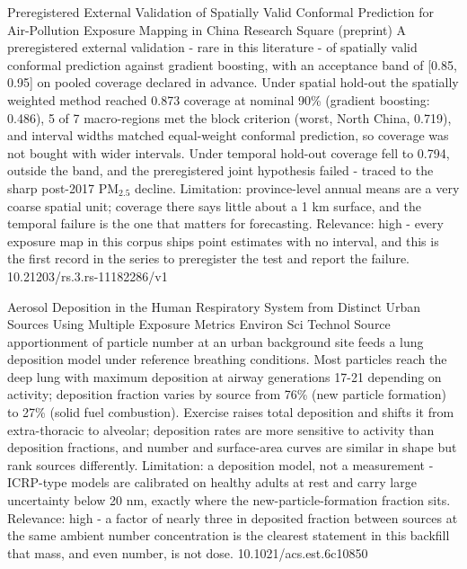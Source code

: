 \documentclass[10pt]{article}
\begin{document}
{Preregistered External Validation of Spatially Valid Conformal Prediction for Air-Pollution Exposure Mapping in China}
{Research Square (preprint)}
{A preregistered external validation - rare in this literature - of spatially valid conformal prediction against gradient boosting, with an acceptance band of [0.85, 0.95] on pooled coverage declared in advance. Under spatial hold-out the spatially weighted method reached 0.873 coverage at nominal 90\% (gradient boosting: 0.486), 5 of 7 macro-regions met the block criterion (worst, North China, 0.719), and interval widths matched equal-weight conformal prediction, so coverage was not bought with wider intervals. Under temporal hold-out coverage fell to 0.794, outside the band, and the preregistered joint hypothesis failed - traced to the sharp post-2017 PM$_{2.5}$ decline. Limitation: province-level annual means are a very coarse spatial unit; coverage there says little about a 1 km surface, and the temporal failure is the one that matters for forecasting. Relevance: high - every exposure map in this corpus ships point estimates with no interval, and this is the first record in the series to preregister the test and report the failure.}
{10.21203/rs.3.rs-11182286/v1}

{Aerosol Deposition in the Human Respiratory System from Distinct Urban Sources Using Multiple Exposure Metrics}
{Environ Sci Technol}
{Source apportionment of particle number at an urban background site feeds a lung deposition model under reference breathing conditions. Most particles reach the deep lung with maximum deposition at airway generations 17-21 depending on activity; deposition fraction varies by source from 76\% (new particle formation) to 27\% (solid fuel combustion). Exercise raises total deposition and shifts it from extra-thoracic to alveolar; deposition rates are more sensitive to activity than deposition fractions, and number and surface-area curves are similar in shape but rank sources differently. Limitation: a deposition model, not a measurement - ICRP-type models are calibrated on healthy adults at rest and carry large uncertainty below 20 nm, exactly where the new-particle-formation fraction sits. Relevance: high - a factor of nearly three in deposited fraction between sources at the same ambient number concentration is the clearest statement in this backfill that mass, and even number, is not dose.}
{10.1021/acs.est.6c10850}
\end{document}
